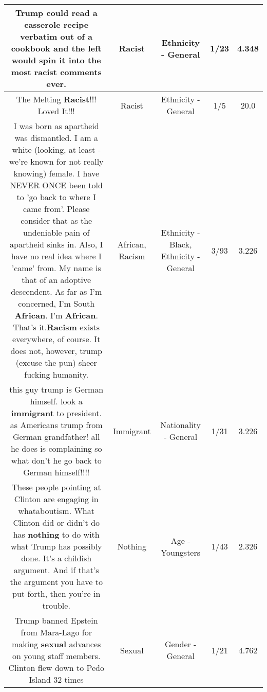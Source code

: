 \documentclass[11pt]{article}
\newlength\mylength
\begin{document}
\begin{center}
\begin{longtable}{|C{.65\mylength}|C{.30\mylength}|C{.12\mylength}|C{.12\mylength}|C{.12\mylength}|}
  \small Trump could read a casserole recipe verbatim out of a cookbook and the left would spin it into the most \textbf{racist} comments ever.\normalsize   & Racist & Ethnicity - General & 1/23 & 4.348 \\  \hline
  \small The Melting \textbf{Racist}!!!  Loved It!!!\normalsize   & Racist & Ethnicity - General & 1/5 & 20.0 \\  \hline
  \small I was born as apartheid was dismantled. I am a white (looking, at least - we're known for not really knowing) female. I have NEVER ONCE been told to 'go back to where I came from'. Please consider that as the undeniable pain of apartheid sinks in. Also, I have no real idea where I 'came' from. My  name is that of an adoptive descendent. As far as I'm concerned, I'm South \textbf{African}. I'm \textbf{African}. That's it.\textbf{Racism} exists everywhere, of course. It does not, however, trump (excuse the pun) sheer fucking humanity.\normalsize   & African, Racism & Ethnicity - Black, Ethnicity - General & 3/93 & 3.226 \\  \hline
  \small this guy trump is German himself. look a \textbf{immigrant} to president. as Americans trump from German grandfather! all he does is complaining so what don't he go back to German himself!!!!\normalsize   & Immigrant & Nationality - General & 1/31 & 3.226 \\  \hline
  \small These people pointing at Clinton are engaging in whataboutism. What Clinton did or didn't do has \textbf{nothing} to do with what Trump has possibly done. It's a childish argument. And if that's the argument you have to put forth, then you're in trouble.\normalsize   & Nothing & Age - Youngsters & 1/43 & 2.326 \\  \hline
  \small Trump banned Epstein from Mara-Lago for making \textbf{sexual} advances on young staff members. Clinton flew down to Pedo Island 32 times\normalsize   & Sexual & Gender - General & 1/21 & 4.762 \\  \hline

\end{longtable}
\end{center}
\end{document}
